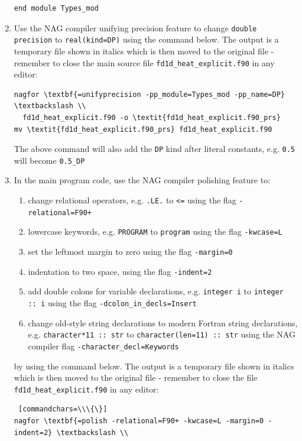 \documentclass[12pt]{article}
\begin{document}
\begin{enumerate}
\begin{lstlisting}
end module Types_mod
\end{lstlisting} 
\item Use the NAG compiler unifying precision feature to change \texttt{double precision} to \texttt{real(kind=DP)}
  using the command below. The output is a temporary file shown in italics which is then moved to the original file -
  remember to close the main source file \texttt{fd1d\_heat\_explicit.f90} in any editor:
\begin{Verbatim}[commandchars=\\\{\}]
nagfor \textbf{=unifyprecision -pp_module=Types_mod -pp_name=DP} \textbackslash \\
  fd1d_heat_explicit.f90 -o \textit{fd1d_heat_explicit.f90_prs}
mv \textit{fd1d_heat_explicit.f90_prs} fd1d_heat_explicit.f90
\end{Verbatim}
The above command will also add the \texttt{DP} kind after literal constants, e.g. \texttt{0.5}
will become \texttt{0.5\_DP}
\item In the main program code, use the NAG compiler polishing feature to:
\begin{enumerate}
\item change relational operators, e.g. \texttt{.LE.} to \texttt{<=} using the flag \texttt{-relational=F90+}
\item lowercase keywords, e.g. \texttt{PROGRAM} to \texttt{program} using the flag \texttt{-kwcase=L}
\item set the leftmost margin to zero using the flag \texttt{-margin=0}
\item indentation to two space, using the flag \texttt{-indent=2}
\item add double colons for variable declarations, e.g. \texttt{integer i} to \texttt{integer ::\ i} using the flag
  \texttt{-dcolon\_in\_decls=Insert}
\item change old-style string declarations to modern Fortran string declarations, e.g. \texttt{character*11 ::\ str} to
\texttt{character(len=11) ::\ str} using the NAG compiler flag \texttt{-character\_decl=Keywords}
\end{enumerate}
by using the command below. The output is a temporary file shown in italics which is then moved to the original file
- remember to close the file \texttt{fd1d\_heat\_explicit.f90} in any editor:
\begin{Verbatim} [commandchars=\\\{\}]
nagfor \textbf{=polish -relational=F90+ -kwcase=L -margin=0 -indent=2} \textbackslash \\

\end{Verbatim}
\end{enumerate}
\end{document}
